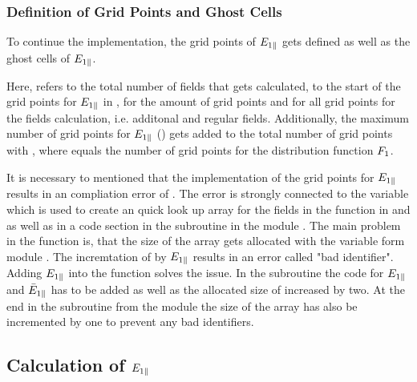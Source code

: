 \subsubsection*{Definition of Grid Points and Ghost Cells}

To continue the implementation, the grid points of $E_{1\parallel}$ gets defined as well as the ghost cells of $E_{1\parallel}$. 

Here,  refers to the total number of fields that gets calculated,  to the start of the grid points for $E_{1\parallel}$ in ,  for the amount of grid points and  for all grid points for the fields calculation, i.e. additonal and regular fields. Additionally, the maximum number of grid points for $E_{1\parallel}$ () gets added to the total number of grid points  with , where  equals the number of grid points for the distribution function $F_1$. \bigskip

It is necessary to mentioned that the implementation of the grid points for $E_{1\parallel}$ results in an compliation error of \gkw. The error is strongly connected to the variable  which is used to create an quick look up array for the fields in the function  in  and  as well as in a code section in the subroutine  in the module . The main problem in the function  is, that the size of the array  gets allocated with the variable  form module . The incremtation of  by $E_{1\parallel}$ results in an \gkw error called "bad identifier". Adding $E_{1\parallel}$ into the function solves the issue. In the subroutine  the code for $E_{1\parallel}$ and $\bar{E}_{1\parallel}$ has to be added as well as the allocated size of  increased by two. At the end in the subroutine  from the module  the size of the array  has also be incremented by one to prevent any bad identifiers.

\newpage

\subsection*{Calculation of $E_{1\parallel}$}


